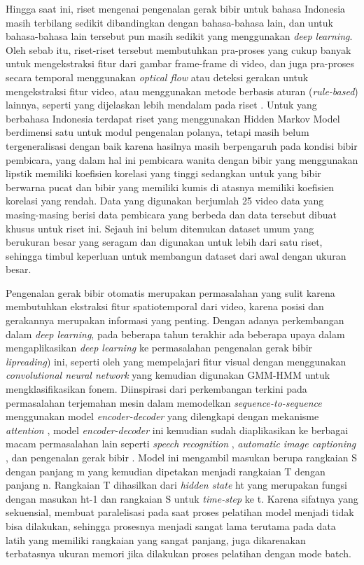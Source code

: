 Hingga saat ini, riset mengenai pengenalan gerak bibir untuk bahasa Indonesia masih terbilang sedikit dibandingkan dengan bahasa-bahasa lain, dan untuk bahasa-bahasa lain tersebut pun masih sedikit yang menggunakan \textit{deep learning}. Oleh sebab itu, riset-riset tersebut membutuhkan pra-proses yang cukup banyak untuk mengekstraksi fitur dari gambar frame-frame di video, dan juga pra-proses secara temporal menggunakan \textit{optical flow} atau deteksi gerakan untuk mengekstraksi fitur video, atau menggunakan metode berbasis aturan (\textit{rule-based}) lainnya, seperti yang dijelaskan lebih mendalam pada riset \textcite{Zhou2014}. Untuk yang berbahasa Indonesia terdapat riset \textcite{Achmad2015} yang menggunakan Hidden Markov Model berdimensi satu untuk modul pengenalan polanya, tetapi masih belum tergeneralisasi dengan baik karena hasilnya masih berpengaruh pada kondisi bibir pembicara, yang dalam hal ini pembicara wanita dengan bibir yang menggunakan lipstik memiliki koefisien korelasi yang tinggi sedangkan untuk yang bibir berwarna pucat dan bibir yang memiliki kumis di atasnya memiliki koefisien korelasi yang rendah. Data yang digunakan berjumlah 25 video data yang masing-masing berisi data pembicara yang berbeda dan data tersebut dibuat khusus untuk riset ini. Sejauh ini belum ditemukan dataset umum yang berukuran besar yang seragam dan digunakan untuk lebih dari satu riset, sehingga timbul keperluan untuk membangun dataset dari awal dengan ukuran besar.
\bigskip

Pengenalan gerak bibir otomatis merupakan permasalahan yang sulit karena membutuhkan ekstraksi fitur spatiotemporal dari video, karena posisi dan gerakannya merupakan informasi yang penting. Dengan adanya perkembangan dalam \textit{deep learning}, pada beberapa tahun terakhir ada beberapa upaya dalam mengaplikasikan \textit{deep learning} ke permasalahan pengenalan gerak bibir \textit{lipreading}) ini, seperti oleh \textcite{Noda2014} yang mempelajari fitur visual dengan menggunakan \textit{convolutional neural network} yang kemudian digunakan GMM-HMM untuk mengklasifikasikan fonem.
\bigskip
Diinspirasi dari perkembangan terkini pada permasalahan terjemahan mesin dalam memodelkan \textit{sequence-to-sequence} menggunakan model \textit{encoder-decoder} yang dilengkapi dengan mekanisme \textit{attention} \parencite{Bahdanau2015}, model \textit{encoder-decoder} ini kemudian sudah diaplikasikan ke berbagai macam permasalahan lain seperti \textit{speech recognition} \parencite{Chan2015}, \textit{automatic image captioning} \parencite{Vinyals2014} \parencite{Xu2015}, dan pengenalan gerak bibir \parencite{Chung2017}. Model ini mengambil masukan berupa rangkaian S dengan panjang m yang kemudian dipetakan menjadi rangkaian T dengan panjang n. Rangkaian T dihasilkan dari \textit{hidden state} ht yang merupakan fungsi dengan masukan ht-1 dan rangkaian S untuk \textit{time-step} ke t. Karena sifatnya yang sekuensial, membuat paralelisasi pada saat proses pelatihan model menjadi tidak bisa dilakukan, sehingga prosesnya menjadi sangat lama terutama pada data latih yang memiliki rangkaian yang sangat panjang, juga dikarenakan terbatasnya ukuran memori jika dilakukan proses pelatihan dengan mode batch.
\bigskip

